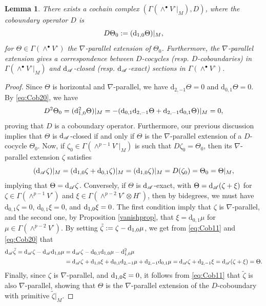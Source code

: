 \documentclass[12pt,letterpaper]{article}
\newcommand{\A}{\mathscr{A}}
\let\oldd\d
\renewcommand{\d}{%
  \relax\ifmmode\mathrm{d}\else\oldd\fi
}
\renewcommand{\dh}{%
  \relax\ifmmode\mathrm{d}_{1,0}\else\olddh\fi
}
\newcommand{\dv}{\mathrm{d}_{0,1}}
\newcommand{\dR}{\mathrm{d}_{2,-1}}
\newtheorem{lemma}[theorem]{Lemma}
\numberwithin{equation}{section}
\begin{document}
\begin{lemma}\label{lemma:CohomD}
  There exists a cochain complex $(\Gamma(\wedge^\bullet V^\circ|_M),D)$, where the coboundary operator $D$ is
  \[
    D\Theta_0 := (\dh\Theta)|_M,
  \]
  for $\Theta\in\Gamma(\wedge^\bullet V^\circ)$ the $\nabla$-parallel extension of $\Theta_0$.
  Furthermore, the $\nabla$-parallel extension gives a correspondence between 
  $D$-cocycles (resp. $D$-coboundaries) in $\Gamma(\wedge^\bullet V^\circ|_M)$ and $\d_\A$-closed (resp. $\d_\A$-exact) sections in $\Gamma(\wedge^\bullet V^\circ)$.
\end{lemma}

\begin{proof}
  Since $\Theta$ is horizontal and $\nabla$-parallel, we have $\dR\Theta=0$ and $\dv\Theta=0$. 
  By \eqref{eq:Cob20}, we have
  \[
    D^2\Theta_0 = (\dh^2\Theta)|_M = -(\dv\dR\Theta + \dR\dv\Theta)|_M = 0,
  \]
  proving that $D$ is a coboundary operator.
  Furthermore, our previous discussion implies that $\Theta$ is $\d_\A$-closed if and only if $\Theta$ is the $\nabla$-parallel extension of a $D$-cocycle $\Theta_0$.
  Now, if $\zeta_0\in\Gamma(\wedge^{p-1}V^\circ|_M)$ is such that $D\zeta_0 = \Theta_0$, then its $\nabla$-parallel extension $\zeta$ satisfies
  \[
    (\d_\A\zeta)|_M = (\dh\zeta + \dv\zeta)|_M = (\dh\zeta)|_M = D(\zeta_0) = \Theta_0 = \Theta|_M,
  \]
  implying that $\Theta=\d_\A\zeta$.
  Conversely, if $\Theta$ is $\d_\A$-exact, with $\Theta = \d_\A(\zeta+\xi)$ for $\zeta\in\Gamma(\wedge^{p-1}V^\circ)$ and $\xi\in\Gamma(\wedge^{p-2}V^\circ\otimes H^\circ)$,
  then by bidegrees, we must have $\dv\zeta=0$, $\dv\xi=0$, and $\dh\xi = 0$.
  The first condition imply that $\zeta$ is $\nabla$-parallel,
  and the second one, by Proposition \ref{vanishprop}, that $\xi=\dv\mu$ for $\mu\in\Gamma(\wedge^{p-2}V^\circ)$.
  By setting $\tilde{\zeta} := \zeta - \dh\mu$, we get from \eqref{eq:Cob11} and \eqref{eq:Cob20} that
  \begin{align*}
    \d_\A\tilde{\zeta} = \d_\A\zeta - \d_\A\dh\mu &= \d_\A\zeta - \dv\dh\mu - \dh^2\mu \\
    &= \d_\A\zeta + \dh\xi + \dv\dR\mu + \dR\dv\mu = \d_\A\zeta + \dR\xi = \d_\A(\zeta+\xi) = \Theta.
  \end{align*}
  Finally, since $\zeta$ is $\nabla$-parallel, and $\dh\xi=0$, it follows from \eqref{eq:Cob11} that $\tilde{\zeta}$ is also $\nabla$-parallel,
  showing that $\Theta$ is the $\nabla$-parallel extension of the $D$-coboundary with primitive $\tilde{\zeta}|_M$.
\end{proof}
\end{document}
